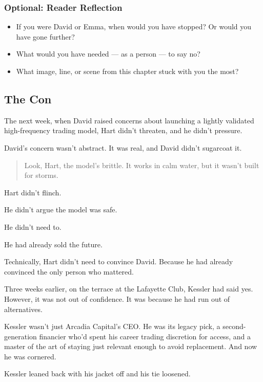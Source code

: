 \subsubsection{Optional: Reader Reflection}

\begin{itemize}
  \item If you were David or Emma, when would you have stopped? Or would you have gone further?
  \item What would you have needed — as a person — to say no?
  \item What image, line, or scene from this chapter stuck with you the most?
\end{itemize}




\subsection{The Con}

The next week, when David raised concerns about launching a lightly validated high-frequency trading model,  
Hart didn’t threaten, and he didn’t pressure.

David’s concern wasn’t abstract. It was real, and David didn’t sugarcoat it.

\begin{quote}
  Look, Hart, the model’s brittle. It works in calm water, but it wasn’t built for storms.
\end{quote}

Hart didn’t flinch.  

He didn’t argue the model was safe.  

He didn’t need to.  

He had already sold the future.

Technically, Hart didn’t need to convince David. Because he had already convinced the only person who mattered.

Three weeks earlier, on the terrace at the Lafayette Club,
Kessler had said yes. However, it was not out of confidence. It was because he had run out of alternatives.

Kessler wasn’t just Arcadia Capital’s CEO. 
He was its legacy pick, a second-generation financier who’d spent his career trading discretion for access, and a master 
of the art of staying just relevant enough to avoid replacement. And now he was cornered. 

Kessler leaned back with his jacket off and his tie loosened.

